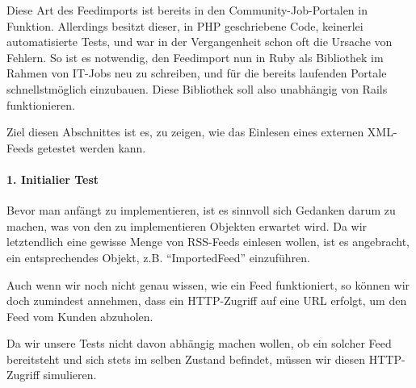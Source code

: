 Diese Art des Feedimports ist bereits in den Community-Job-Portalen in Funktion. Allerdings besitzt dieser, in PHP geschriebene Code, keinerlei automatisierte Tests, und war in der Vergangenheit schon oft die Ursache von Fehlern. So ist es notwendig, den Feedimport nun in Ruby als Bibliothek im Rahmen von IT-Jobs neu zu schreiben, und für die bereits laufenden Portale schnellstmöglich einzubauen.
Diese Bibliothek soll also unabhängig von Rails funktionieren.

Ziel diesen Abschnittes ist es, zu zeigen, wie das Einlesen eines externen XML-Feeds getestet werden kann.

\paragraph{1. Initialier Test}

Bevor man anfängt zu implementieren, ist es sinnvoll sich Gedanken darum zu machen, was von den zu implementieren Objekten erwartet wird. Da wir letztendlich eine gewisse Menge von RSS-Feeds einlesen wollen, ist es angebracht, ein entsprechendes Objekt, z.B. "`ImportedFeed"' einzuführen.

Auch wenn wir noch nicht genau wissen, wie ein Feed funktioniert, so können wir doch zumindest annehmen, dass ein HTTP-Zugriff auf eine URL erfolgt, um den Feed vom Kunden abzuholen.

Da wir unsere Tests nicht davon abhängig machen wollen, ob ein solcher Feed bereitsteht und sich stets im selben Zustand befindet, müssen wir diesen HTTP-Zugriff simulieren.

\begin{ruby}[label=test/test\_imported\_feed.rb]
    
  

   

    
\end{ruby}





